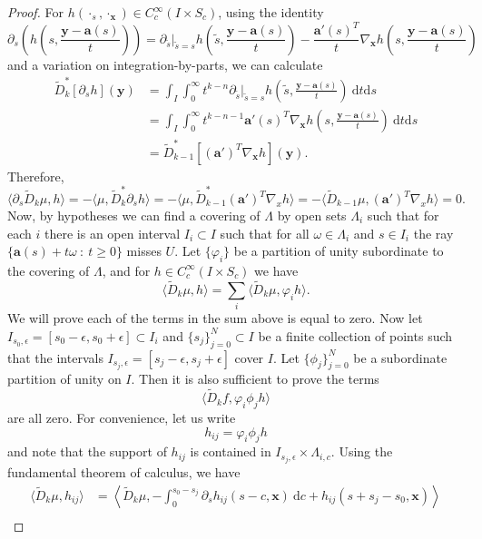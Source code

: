 \documentclass[10pt,a4paper]{amsart}
\newcommand{\va}{\mathbf{a}}
\newcommand{\vx}{{\mathbf{x}}}
\newcommand{\vy}{{\mathbf{y}}}
\begin{document}
\begin{proof}
For $h(\cdot_s,\cdot_\vx) \in C_c^\infty(I \times S_c)$, using the identity
\[
\partial_s \left ( h \left ( s , \frac{\vy - \va(s)}{t} \right ) \right ) = \partial_{\widetilde{s}}|_{\widetilde{s} = s} h \left ( \widetilde{s} , \frac{\vy - \va(s)}{t} \right ) - \frac{\va'(s)^T}{t} \nabla_\vx h \left ( s , \frac{\vy - \va(s)}{t} \right )
\]
and a variation on integration-by-parts, we can calculate
\[
\begin{split}
\widetilde{D}_k^* [\partial_sh](\vy) & = \int_I \int_0^\infty t^{k-n} \partial_{\tilde{s}}|_{\tilde{s} = s} h\left ( \tilde{s}, \frac{\vy-\va(s)}{t} \right )\ \mathrm{d}t \mathrm{d}s\\
& =  \int_I \int_0^\infty t^{k-n-1} \va'(s)^T \nabla_\vx h\left ( s, \frac{\vy-\va(s)}{t} \right )\ \mathrm{d}t \mathrm{d}s \\
& = \widetilde{D}_{k-1}^* [(\va')^T \nabla_\vx h](\vy).
\end{split}
\]
Therefore,
\begin{equation}\label{eq:dDkfzero}
\langle \partial_s \widetilde{D}_k \mu, h \rangle = -\langle \mu,\widetilde{D}^*_k \partial_s h \rangle = -\langle \mu,\widetilde{D}^*_{k-1} (\va')^T\nabla_x h \rangle = -\langle \widetilde{D}_{k-1} \mu, (\va')^T\nabla_x h \rangle = 0.
\end{equation}
Now, by hypotheses we can find a covering of $\Lambda$ by open sets $\Lambda_i$ such that for each $i$ there is an open interval $I_i \subset I$ such that for all $\omega \in \Lambda_i$ and $s \in I_i$ the ray $\{\va(s) + t\omega \ :\ t\geq 0\}$ misses $U$. Let $\{\varphi_i\}$ be a partition of unity subordinate to the covering of $\Lambda$, and for $h \in C_c^\infty(I \times S_c)$ we have
\[
\langle \widetilde{D}_k\mu,h \rangle = \sum_{i} \langle \widetilde{D}_k\mu, \varphi_ih \rangle.
\]
We will prove each of the terms in the sum above is equal to zero. Now let $I_{s_0,\epsilon} = [s_0-\epsilon,s_0+\epsilon] \subset I_i$ and $\{s_j\}_{j=0}^N \subset I$ be a finite collection of points such that the intervals $I_{s_j,\epsilon} = [s_j - \epsilon,s_j+\epsilon]$ cover $I$. Let $\{\phi_j\}_{j=0}^N$ be a subordinate partition of unity on $I$. Then it is also sufficient to prove the terms
\[
\langle \widetilde{D}_k f,\varphi_i \phi_j h \rangle
\]
are all zero. For convenience, let us write \[
h_{ij} = \varphi_i \phi_j h
\]
and note that the support of $h_{ij}$ is contained in $I_{s_j,\epsilon} \times \Lambda_{i,c}$. Using the fundamental theorem of calculus, we have
\[
\begin{split}
\langle \widetilde{D}_k \mu, h_{ij} \rangle & = \left \langle \widetilde{D}_k \mu, -\int_0^{s_0-s_j} \partial_s h_{ij}(s-c,\vx) \ \mathrm{d}c + h_{ij}(s+s_j - s_0,\vx) \right \rangle\\

\end{split}\]
\end{proof}
\end{document}
